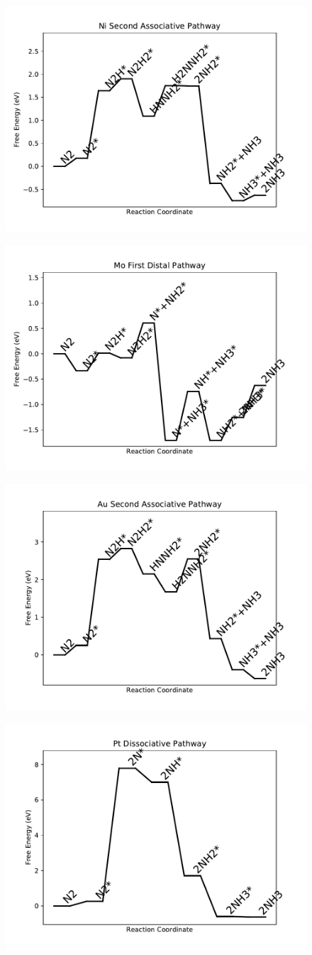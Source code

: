\documentclass[journal=jacsat,manuscript=article]{achemso}
\begin{document}
\begin{figure}
\includegraphics[width=0.5\linewidth]{data/plots/Ni_associative_2.pdf}
\label{fig:Ni_associative_2}
\end{figure}

\newpage
\begin{figure}
\includegraphics[width=0.5\linewidth]{data/plots/Mo_distal_1.pdf}
\label{fig:Mo_distal_1}
\end{figure}

\begin{figure}
\includegraphics[width=0.5\linewidth]{data/plots/Au_associative_2.pdf}
\label{fig:Au_associative_2}
\end{figure}

\newpage
\begin{figure}
\includegraphics[width=0.5\linewidth]{data/plots/Pt_dissociative.pdf}
\label{fig:Pt_dissociative}
\end{figure}
\end{document}
